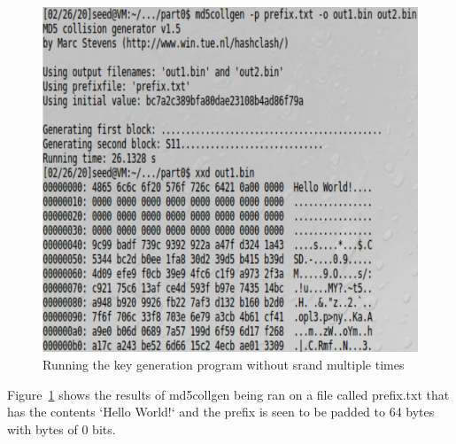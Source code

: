 \documentclass[12pt]{article}
\begin{document}
\begin{figure}[H]
	\begin{center}
		\includegraphics[scale=0.65]{pics/t1p0.png}
	\end{center}{}
	\caption{Running the key generation program without srand multiple times}
	\label{fig:t1p0}
\end{figure}


Figure~\ref{fig:t1p0} shows the results of md5collgen being ran on a file called prefix.txt that has the contents `Hello World!` and the prefix is seen to be padded to 64 bytes with bytes of 0 bits.
\end{document}
